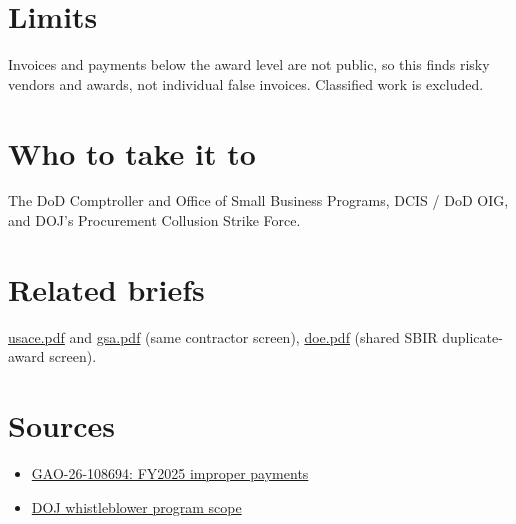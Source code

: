 \documentclass[letterpaper,11pt]{article}
\providecommand{\tightlist}{\setlength{\itemsep}{0pt}\setlength{\parskip}{0pt}}
\begin{document}
\hypertarget{limits}{%
\section{Limits}\label{limits}}

Invoices and payments below the award level are not public, so this
finds risky vendors and awards, not individual false invoices.
Classified work is excluded.

\hypertarget{who-to-take-it-to}{%
\section{Who to take it to}\label{who-to-take-it-to}}

The DoD Comptroller and Office of Small Business Programs, DCIS / DoD
OIG, and DOJ's Procurement Collusion Strike Force.

\hypertarget{related-briefs}{%
\section{Related briefs}\label{related-briefs}}

\url{usace.pdf} and \url{gsa.pdf} (same contractor screen),
\url{doe.pdf} (shared SBIR duplicate-award screen).

\hypertarget{sources}{%
\section{Sources}\label{sources}}

\begin{itemize}
\tightlist
\item
  \href{https://www.gao.gov/products/gao-26-108694}{GAO-26-108694:
  FY2025 improper payments}
\item
  \href{https://www.justice.gov/fraud/whistleblower}{DOJ whistleblower
  program scope}
\end{itemize}
\end{document}
